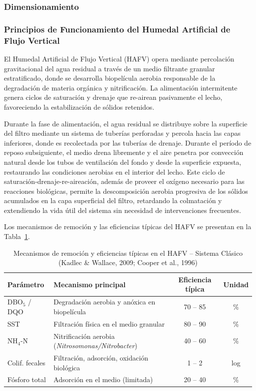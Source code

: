 \documentclass[12pt,a4paper]{article}
\begin{document}
\subsubsection{Dimensionamiento}

\subsubsection*{Principios de Funcionamiento del Humedal Artificial de Flujo Vertical}

El Humedal Artificial de Flujo Vertical (HAFV) opera mediante percolación gravitacional del agua residual a través de un medio filtrante granular estratificado, donde se desarrolla biopelícula aerobia responsable de la degradación de materia orgánica y nitrificación. La alimentación intermitente genera ciclos de saturación y drenaje que re-airean pasivamente el lecho, favoreciendo la estabilización de sólidos retenidos.

Durante la fase de alimentación, el agua residual se distribuye sobre la superficie del filtro mediante un sistema de tuberías perforadas y percola hacia las capas inferiores, donde es recolectada por las tuberías de drenaje. Durante el período de reposo subsiguiente, el medio drena libremente y el aire penetra por convección natural desde los tubos de ventilación del fondo y desde la superficie expuesta, restaurando las condiciones aerobias en el interior del lecho. Este ciclo de saturación-drenaje-re-aireación, además de proveer el oxígeno necesario para las reacciones biológicas, permite la descomposición aerobia progresiva de los sólidos acumulados en la capa superficial del filtro, retardando la colmatación y extendiendo la vida útil del sistema sin necesidad de intervenciones frecuentes.

Los mecanismos de remoción y las eficiencias típicas del HAFV se presentan en la Tabla~\ref{tab:mecanismos_hafv_a}.

\begin{table}[H]
\centering
\caption{Mecanismos de remoción y eficiencias típicas en el HAFV -- Sistema Clásico (Kadlec \& Wallace, 2009; Cooper et al., 1996)}
\label{tab:mecanismos_hafv_a}
\begin{tabular}{p{2.2cm}p{6.5cm}cc}
\toprule
\textbf{Parámetro} & \textbf{Mecanismo principal} & \textbf{Eficiencia típica} & \textbf{Unidad} \\
\midrule
DBO$_5$ / DQO & Degradación aerobia y anóxica en biopelícula & 70 -- 85 & \% \\
SST & Filtración física en el medio granular & 80 -- 90 & \% \\
NH$_4$-N & Nitrificación aerobia (\textit{Nitrosomonas/Nitrobacter}) & 40 -- 60 & \% \\
Colif. fecales & Filtración, adsorción, oxidación biológica & 1 -- 2 & log \\
Fósforo total & Adsorción en el medio (limitada) & 20 -- 40 & \% \\
\bottomrule
\end{tabular}
\end{table}
\end{document}
